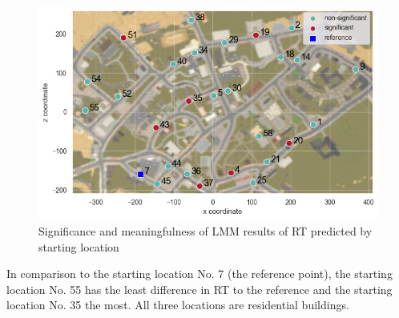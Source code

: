 \begin{figure}[!htb]
	\centering
	\includegraphics[width=150mm]{figures/significance_starting_locations_RT_map_23.png}
	\caption[Significance and meaningfulness (RT predicted by starting location)]{Significance and meaningfulness of LMM results of RT predicted by starting location}
	\label{fig:sig_RT_loc_map}
\end{figure}

In comparison to the starting location No. 7 (the reference point), the starting location No. 55 has the least difference in RT to the reference and the starting location No. 35 the most. All three locations are residential buildings.

